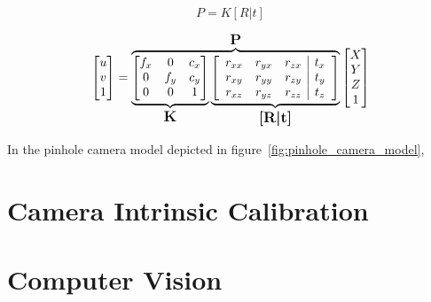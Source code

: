 \begin{equation}
	\label{eq:projective_matrix}
	P = K[R|t]
\end{equation}

\begin{equation}
	\label{eq:camera_transform_full}
	\begin{bmatrix}
		u \\
		v \\
		1
	\end{bmatrix}
	= 
	\overbrace{
		\underbrace{
			\begin{bmatrix}
				f_x & 0 & c_x \\
				0 & f_y & c_y \\
				0 & 0 & 1 
			\end{bmatrix}
		}_\text{\large\textbf{K}}
		\underbrace{
			\left[
				\begin{array}{ccc|c}
					r_{xx} & r_{yx} & r_{zx} & t_x \\
					r_{xy} & r_{yy} & r_{zy} & t_y \\
					r_{xz} & r_{yz} & r_{zz} & t_z 
				\end{array}
		\right]
		}_\text{\large\textbf{[R|t]}}
	}^\text{\large\textbf{P}}
	\begin{bmatrix}
		X \\
		Y \\
		Z \\
		1
	\end{bmatrix}
\end{equation}


In the pinhole camera model depicted in figure~\ref{fig:pinhole_camera_model}, 


\section{Camera Intrinsic Calibration}

\section{Computer Vision}

